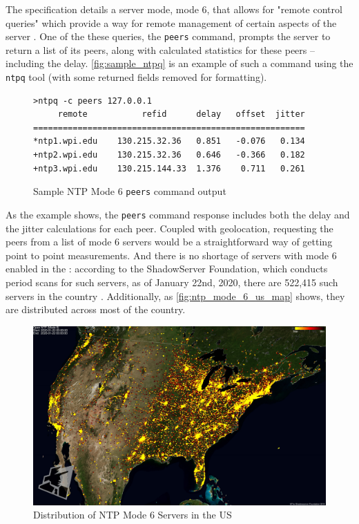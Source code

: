 The \ntp specification details a server mode, mode 6, that allows for "remote control queries" which provide a way for remote management of certain aspects of the server \cite{Haberman2019Control4}. One of the these queries, the \texttt{peers} command, prompts the server to return a list of its peers, along with calculated statistics for these peers -- including the delay. \autoref{fig:sample_ntpq} is an example of such a command using the \texttt{ntpq} tool (with some returned fields removed for formatting).

\begin{figure}[h]
    \centering
    \begin{verbatim}
>ntpq -c peers 127.0.0.1
     remote           refid      delay   offset  jitter
=======================================================
*ntp1.wpi.edu    130.215.32.36   0.851   -0.076   0.134
+ntp2.wpi.edu    130.215.32.36   0.646   -0.366   0.182
+ntp3.wpi.edu    130.215.144.33  1.376    0.711   0.261
    \end{verbatim}
    \caption{Sample NTP Mode 6 \texttt{peers} command output}
    \label{fig:sample_ntpq}
\end{figure}

As the example shows, the \texttt{peers} command response includes both the delay and the jitter calculations for each peer. Coupled with \ip geolocation, requesting the peers from a list of mode 6 \ntp servers would be a straightforward way of getting point to point measurements. And there is no shortage of \ntp servers with mode 6 enabled in the \us: according to the ShadowServer Foundation, which conducts period scans for such servers, as of January 22nd, 2020, there are 522,415 such servers in the country \cite{TheShadowserverFoundationNTPProject}. Additionally, as \autoref{fig:ntp_mode_6_us_map} shows, they are distributed across most of the country.

\begin{figure}[H]
    \centering
    \includegraphics[width=\textwidth]{images/ntpversion_united_states_current.jpg}
    \caption{Distribution of NTP Mode 6 Servers in the US}
    \label{fig:ntp_mode_6_us_map}
\end{figure}

